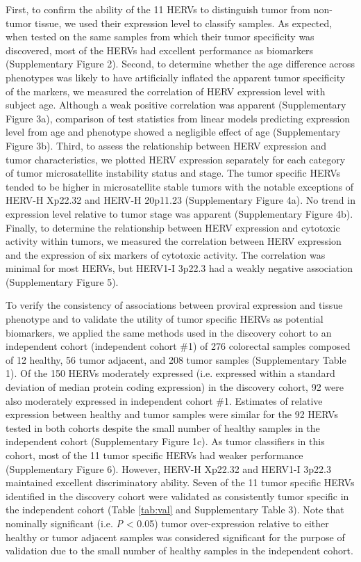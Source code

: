 First, to confirm the ability of the 11 HERVs to distinguish tumor from non-tumor tissue, we used their expression level to classify samples.
As expected, when tested on the same samples from which their tumor specificity was discovered, most of the HERVs had excellent performance as biomarkers (Supplementary Figure 2).
Second, to determine whether the age difference across phenotypes was likely to have artificially inflated the apparent tumor specificity of the markers, we measured the correlation of HERV expression level with subject age.
Although a weak positive correlation was apparent (Supplementary Figure 3a), comparison of test statistics from linear models predicting expression level from age and phenotype showed a negligible effect of age (Supplementary Figure 3b).
Third, to assess the relationship between HERV expression and tumor characteristics, we plotted HERV expression separately for each category of tumor microsatellite instability status and stage.
The tumor specific HERVs tended to be higher in microsatellite stable tumors with the notable exceptions of HERV-H Xp22.32 and HERV-H 20p11.23 (Supplementary Figure 4a).
No trend in expression level relative to tumor stage was apparent (Supplementary Figure 4b).
Finally, to determine the relationship between HERV expression and cytotoxic activity within tumors, we measured the correlation between HERV expression and the expression of six markers of cytotoxic activity.
The correlation was minimal for most HERVs, but HERV1-I 3p22.3 had a weakly negative association (Supplementary Figure 5).

To verify the consistency of associations between proviral expression and tissue phenotype and to validate the utility of tumor specific HERVs as potential biomarkers, we applied the same methods used in the discovery cohort to an independent cohort (independent cohort \#1) of 276 colorectal samples composed of 12 healthy, 56 tumor adjacent, and 208 tumor samples (Supplementary Table 1).
Of the 150 HERVs moderately expressed (i.e. expressed within a standard deviation of median protein coding expression) in the discovery cohort, 92 were also moderately expressed in independent cohort \#1.
Estimates of relative expression between healthy and tumor samples were similar for the 92 HERVs tested in both cohorts despite the small number of healthy samples in the independent cohort (Supplementary Figure 1c).
As tumor classifiers in this cohort, most of the 11 tumor specific HERVs had weaker performance (Supplementary Figure 6).
However, HERV-H Xp22.32 and HERV1-I 3p22.3 maintained excellent discriminatory ability.
Seven of the 11 tumor specific HERVs identified in the discovery cohort were validated as consistently tumor specific in the independent cohort (Table \ref{tab:val} and Supplementary Table 3).
Note that nominally significant (i.e. \emph{P} < 0.05) tumor over-expression relative to either healthy or tumor adjacent samples was considered significant for the purpose of validation due to the small number of healthy samples in the independent cohort.

